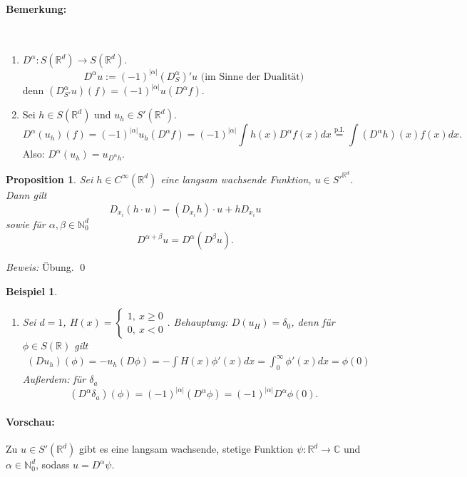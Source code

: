 \documentclass[12pt]{extreport} %
\newtheorem{Beispiel}[Satz]{Beispiel}
\newtheorem{Prop}[Satz]{Proposition}
\numberwithin{equation}{section}
\newcommand{\C}{\mathbb{C}} %
\newcommand{\R}{\mathbb{R}} %
\newcommand{\N}{\mathbb{N}} %
\newcommand{\m}{\cdot}
\newcommand{\Bew}{\emph{Beweis: }}
\begin{document}
	\paragraph{Bemerkung:} ~
	\begin{enumerate}
		\item[a)] $D^\alpha: S(\R^d)\rightarrow S(\R^d)$. 
		$$D^\alpha u := (-1)^{|\alpha|}(D_S^\alpha)'u \text{ (im Sinne der Dualität)}$$
		denn $(D_{S'}^\alpha u)(f) = (-1)^{|\alpha|} u(D^\alpha f)$.
		\item[b)] Sei $h\in S(\R^d)$ und $u_h\in S'(\R^d)$. 
		$$D^\alpha(u_h)(f) = (-1)^{|\alpha|} u_h(D^\alpha f) = (-1)^{|\alpha|}\int h(x) D^\alpha f(x) dx \overset{\text{p.I.}}{=} \int(D^\alpha h)(x) f(x) dx.$$
		Also: $\boxed{D^\alpha (u_h) = u_{D^\alpha h}.}$
	\end{enumerate}
	
	\begin{Prop}
		Sei $h\in C^{\infty}(\R^d)$ eine langsam wachsende Funktion, $u\in S'^{\R^d}$. Dann gilt
		$$D_{x_i}(h\m u) = (D_{x_i}h) \m u + h D_{x_i}u$$
		sowie für $\alpha,\beta\in \N_0^d$
		$$D^{\alpha+\beta}u = D^\alpha(D^\beta u).$$
	\end{Prop}
	
	\Bew Übung.
	\qed
	
	\begin{Beispiel}
		~
		\begin{enumerate}
			\item[a)] Sei $d= 1$, $H(x) =\left\{\begin{array}{l}
			1, ~x\geq 0\\
			0, ~x< 0
			\end{array}
			\right.$. Behauptung: $D(u_H) = \delta_0$, denn für $\phi\in S(\R)$ gilt
			\begin{eqnarray}
				(Du_h)(\phi) = -u_h(D\phi) = -\int H(x)\phi'(x)dx = \int_0^\infty \phi'(x) dx = \phi(0)\nonumber
			\end{eqnarray}
			Außerdem: für $\delta_a$
			$$(D^\alpha\delta_a)(\phi) = (-1)^{|\alpha|}(D^\alpha\phi) = (-1)^{|\alpha|}D^\alpha\phi(0).$$
		\end{enumerate}
	\end{Beispiel}
	
	\paragraph{Vorschau:} Zu $u\in S'(\R^d)$ gibt es eine langsam wachsende, stetige Funktion $\psi:\R^d\rightarrow\C$ und $\alpha\in \N_0^d$, sodass $u= D^\alpha\psi$.
	
\end{document}
